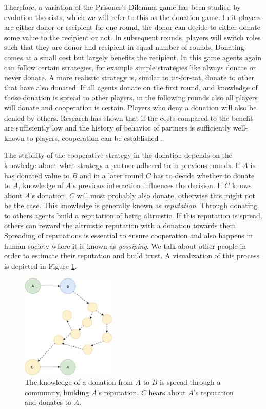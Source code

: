 Therefore, a variation of the Prisoner's Dilemma game has been studied by evolution theorists, which
we will refer to this as the donation game. In it players are either donor or recipient for one round, the donor can decide to either donate
some value to the recipient or not. In subsequent rounds, players will switch roles such that they
are donor and recipient in equal number of rounds. Donating comes at a small cost but largely benefits the recipient.
In this game agents again can follow certain strategies, for example simple strategies like always donate or never
donate. A more realistic strategy is, similar to tit-for-tat, donate to other that have also donated.
If all agents donate on the first round, and knowledge of those donation is spread to other players, 
in the following rounds also all players will donate and cooperation is certain. Players who deny a
donation will also be denied by others.
Research has shown that if the costs compared to the benefit are sufficiently low and the history of
behavior of partners is sufficiently well-known to players, cooperation can be established \cite{nowak2005evolution}.

The stability of the cooperative strategy in the donation depends on the knowledge about what strategy
a partner adhered to in previous rounds. If $A$ is has donated value to $B$ and in a later round 
$C$ has to decide whether to donate to $A$, knowledge of $A$'s previous interaction influences the 
decision. If $C$ knows about $A$'s donation, $C$ will most probably also donate, otherwise this might
not be the case. This knowledge is generally known as \textit{reputation}. Through donating to others
agents build a reputation of being altruistic. If this reputation is spread, others can reward the
altruistic reputation with a donation towards them. Spreading of reputations is essential to ensure
cooperation and also happens in human society where it is known as \textit{gossiping}. We talk about
other people in order to estimate their reputation and build trust. A visualization of this process 
is depicted in Figure \ref{fig:reputation_building}. 

\begin{figure}
    \centering
    \includegraphics[width=0.4\textwidth]{images/reputation_building.pdf}
    \caption{The knowledge of a donation from $A$ to $B$ is spread through a community, building $A$'s
    reputation. $C$ hears about $A$'s reputation and donates to $A$.}
    \label{fig:reputation_building}
\end{figure}


